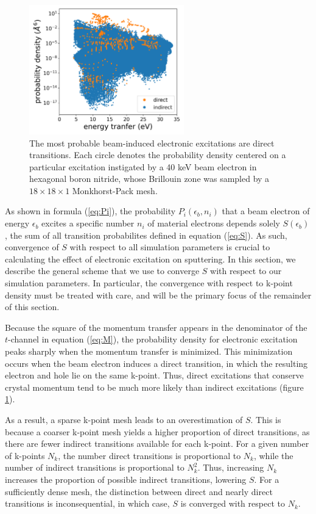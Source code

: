 \documentclass{article}
\begin{document}
\begin{figure}[H]
  \centering
  \includegraphics[width=0.6\textwidth]{figures/scatterDirHBN.png}
  \caption{
    The most probable beam-induced electronic excitations are direct
    transitions.
    Each circle denotes the probability density centered on a particular
    excitation instigated by a 40 keV beam electron in hexagonal boron nitride,
    whose Brillouin zone was sampled by a $18\times18\times1$ Monkhorst-Pack
    mesh.
  }
  \label{fig:scatter}
\end{figure}
%
As shown in formula (\ref{eq:Pi}), the probability $P_i(\epsilon_b, n_i)$ that
a beam electron of energy $\epsilon_b$ excites a specific number $n_i$ of
material electrons depends solely $S(\epsilon_b)$, the sum of all transition
probabilites defined in equation (\ref{eq:S}).
As such, convergence of $S$ with respect to all simulation parameters is
crucial to calculating the effect of electronic excitation on sputtering.
In this section, we describe the general scheme that we use to converge $S$
with respect to our simulation parameters.
In particular, the convergence with respect to k-point density must be treated
with care, and will be the primary focus of the remainder of this section.

Because the square of the momentum transfer appears in the denominator of the
$t$-channel in equation (\ref{eq:M}), the probability density for electronic
excitation peaks sharply when the momentum transfer is minimized.
This minimization occurs when the beam electron induces a direct transition,
in which the resulting electron and hole lie on the same k-point.
Thus, direct excitations that conserve crystal momentum tend to be much more
likely than indirect excitations (figure \ref{fig:scatter}).

As a result, a sparse k-point mesh leads to an overestimation of $S$.
This is because a coarser k-point mesh yields a higher proportion of direct
transitions, as there are fewer indirect transitions available for each
k-point.
For a given number of k-points $N_k$, the number direct transitions is
proportional to $N_k$, while the number of indirect transitions is proportional
to $N_k^2$.
Thus, increasing $N_k$ increases the proportion of possible indirect
transitions, lowering $S$.
For a sufficiently dense mesh, the distinction between direct and nearly direct
transitions is inconsequential, in which case, $S$ is converged with respect to
$N_k$.
\end{document}
